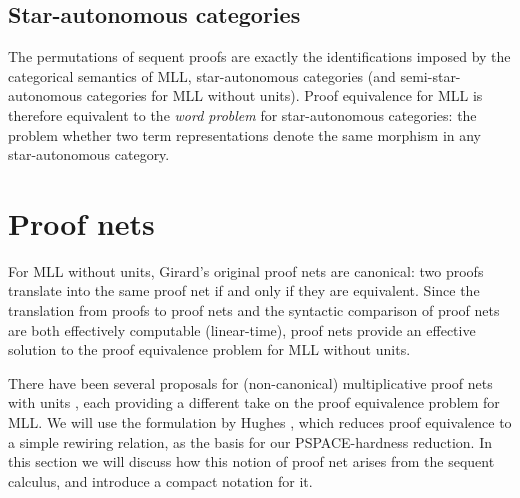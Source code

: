 \documentclass{lmcs}
\let\capsabbrev=\uppercase
\begin{document}

\subsection*{Star-autonomous categories}


The permutations of sequent proofs are exactly the identifications imposed by the categorical semantics of \capsabbrev{mll}, star-autonomous categories \cite{Barr-1991} (and semi-star-autonomous categories \cite{Houston-2008,Heijltjes-Strassburger} for \capsabbrev{mll} without units). Proof equivalence for \capsabbrev{mll} is therefore equivalent to the \emph{word problem} for star-autonomous categories: the problem whether two term representations denote the same morphism in any star-autonomous category.




\section*{Proof nets}


For \capsabbrev{mll} without units, Girard's original proof nets \cite{Girard-1987} are canonical: two proofs translate into the same proof net if and only if they are equivalent. Since the translation from proofs to proof nets and the syntactic comparison of proof nets are both effectively computable (linear-time), proof nets provide an effective solution to the proof equivalence problem for \capsabbrev{mll} without units.

There have been several proposals for (non-canonical) multiplicative proof nets with units \cite{Blute-Cockett-Seely-Trimble-1996, Koh-Ong-1999, Lamarche-Strassburger-2006, Hughes-2012-nets}, each providing a different take on the proof equivalence problem for \capsabbrev{mll}. We will use the formulation by Hughes \cite{Hughes-2012-nets}, which reduces proof equivalence to a simple rewiring relation, as the basis for our \capsabbrev{pspace}-hardness reduction. In this section we will discuss how this notion of proof net arises from the sequent calculus, and introduce a compact notation for it.
\end{document}
